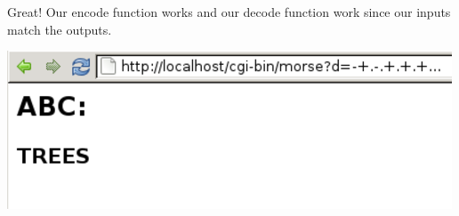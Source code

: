 Great! Our encode function works and our decode function work since our inputs match the outputs.

 
    \includegraphics{../test51.png}
     